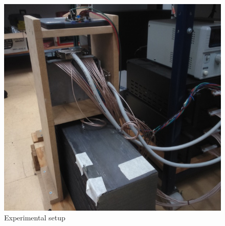 \documentclass[final,5p,times,twocolumn]{elsarticle}
\begin{document}
%
\begin{figure}
\includegraphics[width=0.98\columnwidth,keepaspectratio]{setup}
\caption{Experimental setup}
\end{figure}
%
\end{document}
